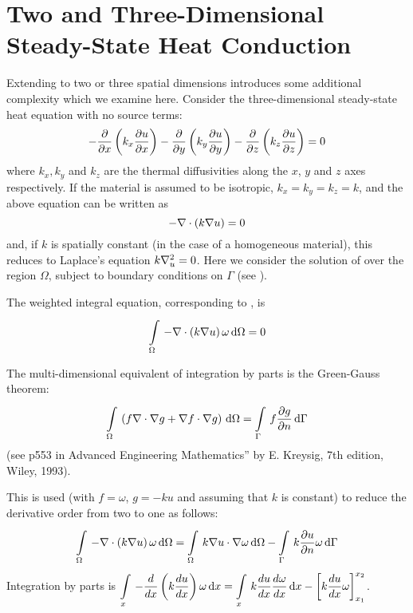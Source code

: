 \section{Two and Three-Dimensional Steady-State Heat Conduction}
\label{sec:2and3-DSSHC}
Extending  to two or three spatial dimensions 
introduces some additional complexity which we examine here. Consider the
three-dimensional steady-state heat equation with no source terms:
\begin{equation*}
  - \dfrac{\partial  }{\partial x} \left( k_{x} \dfrac{\partial u}{\partial x}  \right) - \dfrac{\partial  }{\partial y} \left( k_{y} \dfrac{\partial u}{\partial y}  \right)
  - \dfrac{\partial  }{\partial z} \left( k_{z} \dfrac{\partial u}{\partial z}  \right)=0
\end{equation*}       
where $k_{x},k_{y}$ and $k_{z}$ are the thermal diffusivities along the $x$, $y$
and $z$ axes respectively. If the material is assumed to be isotropic, $k_{x}
= k_{y} = k_{z} = k$, and the above equation can be written
as
\begin{equation}
  -\divergence{}{\pbrac{k \gradient{}{u}}} = 0
  \label{eqn:S-SH}
\end{equation}
and, if $k$ is spatially constant (in the case of a homogeneous material), this reduces to Laplace's equation 
$k\laplacian{u}=0$. Here we consider the solution of  over the 
region $\Omega$, subject to boundary conditions on $\Gamma$ (see ).

The weighted integral equation, corresponding to , is
\begin{equation}
  \goneint{-\divergence{}{\pbrac{k\gradient{}{u}}}\omega}{\Omega} = 0
  \label{eqn:weighted_integral}
\end{equation}

The multi-dimensional equivalent of integration by parts is the Green-Gauss
theorem:
\begin{equation}
  \goneint{\pbrac{f\divergence{}{\gradient{}{g}}+\dotprod{\gradient{}{f}}{\gradient{}{g}}}}{\Omega} =
  \goneint{f \delby{g}{n}}{\Gamma}
  \label{eqn:nabla_eq}
\end{equation}
(see p553 in Advanced Engineering Mathematics'' by E. Kreysig, 7th edition,
Wiley, 1993).

This is used (with $f=\omega$, $g=-ku$ and assuming that $k$ is constant) 
to reduce the derivative order from two to one as follows:
\begin{equation}
  \goneint{-\divergence{}{\pbrac{k\gradient{}{u}}}\omega}{\Omega} 
  = \goneint{k \dotprod{\gradient{}{u}}{\gradient{}{\omega}}}{\Omega} 
  - \goneint{k\delby{u}{n} \omega}{\Gamma}      
  \label{eqn:Green-Gauss}
\end{equation}
\cf Integration by parts is $\goneint{-\dby{ }{x}\pbrac{k\dby{u}{x}}\omega}{x} =
\goneint{k \dby{u}{x} \dby{\omega}{x}}{x} - \inteval{k\dby{u}{x}\omega}{x_{1}}{x_{2}}$.

